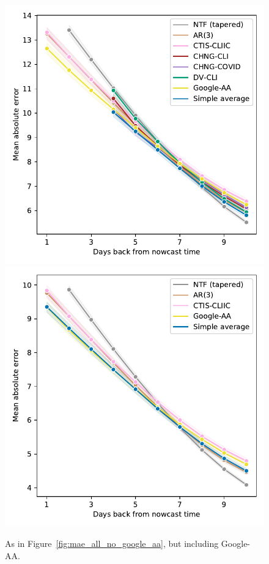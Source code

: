 \documentclass[sts]{imsart}
\theoremstyle{plain}
\theoremstyle{definition}
\theoremstyle{remark}
\begin{document}
\begin{appendix}
\begin{figure}[tb]
\centering
\includegraphics[width=0.825\linewidth]{./figures/lineplot_claims.pdf}
\includegraphics[width=0.825\linewidth]{./figures/lineplot_no_claims.pdf}
\caption{As in Figure~\ref{fig:mae_all_no_google_aa}, but including Google-AA.}    
\label{fig:mae_all}
\end{figure}


\end{appendix}
\end{document}
